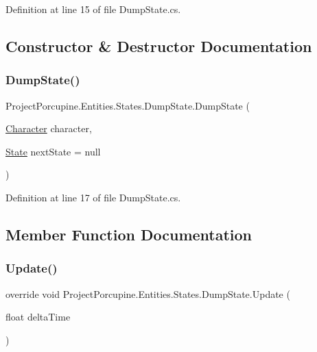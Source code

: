 Definition at line 15 of file Dump\+State.\+cs.



\subsection{Constructor \& Destructor Documentation}
\mbox{\label{class_project_porcupine_1_1_entities_1_1_states_1_1_dump_state_acbc7fae0a174475774572b270d0a7347}} 
\subsubsection{\texorpdfstring{Dump\+State()}{DumpState()}}
{\footnotesize\ttfamily Project\+Porcupine.\+Entities.\+States.\+Dump\+State.\+Dump\+State (\begin{DoxyParamCaption}\item[{\hyperlink{class_project_porcupine_1_1_entities_1_1_character}{Character}}]{character,  }\item[{\hyperlink{class_project_porcupine_1_1_entities_1_1_states_1_1_state}{State}}]{next\+State = {\ttfamily null} }\end{DoxyParamCaption})}



Definition at line 17 of file Dump\+State.\+cs.



\subsection{Member Function Documentation}
\mbox{\label{class_project_porcupine_1_1_entities_1_1_states_1_1_dump_state_a77dc842baa81adec1ae155cdb4c3cf07}} 
\subsubsection{\texorpdfstring{Update()}{Update()}}
{\footnotesize\ttfamily override void Project\+Porcupine.\+Entities.\+States.\+Dump\+State.\+Update (\begin{DoxyParamCaption}\item[{float}]{delta\+Time }\end{DoxyParamCaption})\hspace{0.3cm}{\ttfamily [virtual]}}



